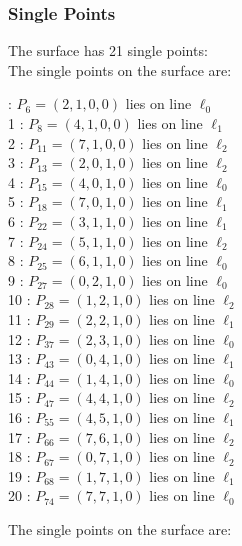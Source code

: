 \documentclass{article}
\begin{document}
{\subsubsection*{Single Points}
The surface has 21 single points:\\
The single points on the surface are:\\
\begin{multicols}{2}
 : $P_{6}=( 2, 1, 0, 0 )$ lies on line $\ell_{0}$\\
1 : $P_{8}=( 4, 1, 0, 0 )$ lies on line $\ell_{1}$\\
2 : $P_{11}=( 7, 1, 0, 0 )$ lies on line $\ell_{2}$\\
3 : $P_{13}=( 2, 0, 1, 0 )$ lies on line $\ell_{2}$\\
4 : $P_{15}=( 4, 0, 1, 0 )$ lies on line $\ell_{0}$\\
5 : $P_{18}=( 7, 0, 1, 0 )$ lies on line $\ell_{1}$\\
6 : $P_{22}=( 3, 1, 1, 0 )$ lies on line $\ell_{1}$\\
7 : $P_{24}=( 5, 1, 1, 0 )$ lies on line $\ell_{2}$\\
8 : $P_{25}=( 6, 1, 1, 0 )$ lies on line $\ell_{0}$\\
9 : $P_{27}=( 0, 2, 1, 0 )$ lies on line $\ell_{0}$\\
10 : $P_{28}=( 1, 2, 1, 0 )$ lies on line $\ell_{2}$\\
11 : $P_{29}=( 2, 2, 1, 0 )$ lies on line $\ell_{1}$\\
12 : $P_{37}=( 2, 3, 1, 0 )$ lies on line $\ell_{0}$\\
13 : $P_{43}=( 0, 4, 1, 0 )$ lies on line $\ell_{1}$\\
14 : $P_{44}=( 1, 4, 1, 0 )$ lies on line $\ell_{0}$\\
15 : $P_{47}=( 4, 4, 1, 0 )$ lies on line $\ell_{2}$\\
16 : $P_{55}=( 4, 5, 1, 0 )$ lies on line $\ell_{1}$\\
17 : $P_{66}=( 7, 6, 1, 0 )$ lies on line $\ell_{2}$\\
18 : $P_{67}=( 0, 7, 1, 0 )$ lies on line $\ell_{2}$\\
19 : $P_{68}=( 1, 7, 1, 0 )$ lies on line $\ell_{1}$\\
20 : $P_{74}=( 7, 7, 1, 0 )$ lies on line $\ell_{0}$\\
\end{multicols}
The single points on the surface are:\\
}
\end{document}
